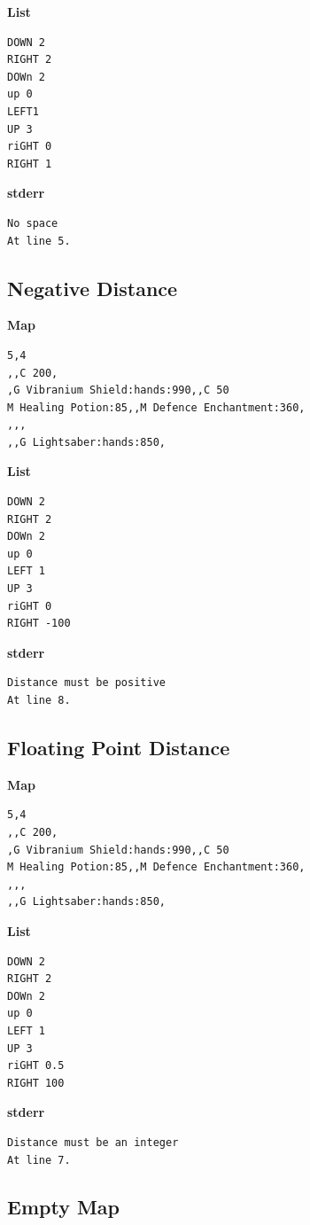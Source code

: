 \documentclass{article}
\begin{document}
\textbf{List}
\begin{lstlisting}
DOWN 2
RIGHT 2
DOWn 2
up 0
LEFT1
UP 3
riGHT 0
RIGHT 1
\end{lstlisting}
\pagebreak

\textbf{stderr}
\begin{lstlisting}
No space
At line 5.
\end{lstlisting}

\subsection{Negative Distance}

\quad \textbf{Map}
\begin{lstlisting}
5,4
,,C 200,
,G Vibranium Shield:hands:990,,C 50
M Healing Potion:85,,M Defence Enchantment:360,
,,,
,,G Lightsaber:hands:850,
\end{lstlisting}

\textbf{List}
\begin{lstlisting}
DOWN 2
RIGHT 2
DOWn 2
up 0
LEFT 1
UP 3
riGHT 0
RIGHT -100
\end{lstlisting}
\pagebreak

\textbf{stderr}
\begin{lstlisting}
Distance must be positive
At line 8.
\end{lstlisting}

\subsection{Floating Point Distance}

\quad \textbf{Map}
\begin{lstlisting}
5,4
,,C 200,
,G Vibranium Shield:hands:990,,C 50
M Healing Potion:85,,M Defence Enchantment:360,
,,,
,,G Lightsaber:hands:850,
\end{lstlisting}

\textbf{List}
\begin{lstlisting}
DOWN 2
RIGHT 2
DOWn 2
up 0
LEFT 1
UP 3
riGHT 0.5
RIGHT 100
\end{lstlisting}
\pagebreak

\textbf{stderr}
\begin{lstlisting}
Distance must be an integer
At line 7.
\end{lstlisting}

\subsection{Empty Map}
\end{document}
